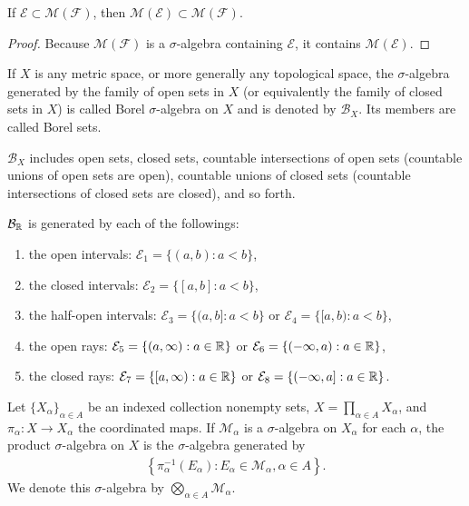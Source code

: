 \begin{lemma}
    If $\mathcal{E} \subset \mathcal{M}(\mathcal{F})$, then $\mathcal{M}(\mathcal{E}) \subset \mathcal{M}(\mathcal{F})$.
\end{lemma}

\begin{proof}
    Because $\mathcal{M}(\mathcal{F})$ is a $\sigma$-algebra containing $\mathcal{E}$, it contains $\mathcal{M}(\mathcal{E})$.
\end{proof}

\begin{definition}
    If $X$ is any metric space, or more generally any topological space, the $\sigma$-algebra generated by the family of open sets in $X$ (or equivalently the family of closed sets in $X$) is called Borel $\sigma$-algebra on $X$ and is denoted by $\mathcal{B}_{X}$.
    Its members are called Borel sets.
\end{definition}

$\mathcal{B}_{X}$ includes open sets, closed sets, countable intersections of open sets (countable unions of open sets are open), countable unions of closed sets (countable intersections of closed sets are closed), and so forth. 

\begin{proposition}
    $\mathcal{B}_{\mathbb{R}}$ is generated by each of the followings:
    \begin{enumerate}
        \item the open intervals: $\mathcal{E}_1 = \{ (a, b): a < b \}$,
        \item the closed intervals: $\mathcal{E}_2 = \{ [a, b]: a < b \}$,
        \item the half-open intervals: $\mathcal{E}_3 = \{ (a, b]: a < b \}$ or $\mathcal{E}_4 = \{ [a, b): a < b \}$,
        \item the open rays: $\mathcal{E}_5 = \{ (a, \infty): a \in \mathbb{R} \}$ or $\mathcal{E}_6 = \{ (-\infty, a): a \in \mathbb{R} \}$,
        \item the closed rays: $\mathcal{E}_7 = \{ [a, \infty): a \in \mathbb{R} \}$ or $\mathcal{E}_8 = \{ (-\infty, a]: a \in \mathbb{R} \}$.
    \end{enumerate}
\end{proposition}

\begin{definition}
    Let $\{ X_{\alpha} \}_{\alpha \in A}$ be an indexed collection nonempty sets, $X = \prod_{\alpha \in A} X_{\alpha}$, and $\pi_{\alpha}: X \to X_{\alpha}$ the coordinated maps.
    If $\mathcal{M}_{\alpha}$ is a $\sigma$-algebra on $X_{\alpha}$ for each $\alpha$, the product $\sigma$-algebra on $X$ is the $\sigma$-algebra generated by
    \begin{align}
        \left\{ \pi_{\alpha}^{-1} (E_\alpha) : E_{\alpha} \in \mathcal{M}_{\alpha}, \alpha \in A \right\}.
    \end{align}
    We denote this $\sigma$-algebra by $\bigotimes_{\alpha \in A} \mathcal{M}_{\alpha}$.
\end{definition}

